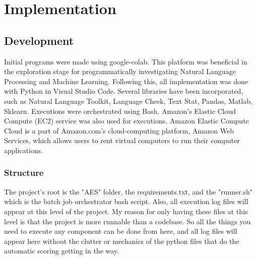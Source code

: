 \chapter{Implementation}\label{C:imp} 



\section{Development}

Initial programs were made using google-colab. This platform was beneficial in the exploration stage for programmatically investigating Natural Language Processing and Machine Learning. Following this, all implementation was done with Python in Visual Studio Code. Several libraries have been incorporated, such as Natural Language Toolkit, Language Check, Text Stat, Pandas, Matlab, Sklearn. Executions were orchestrated using Bash. Amazon's Elastic Cloud Compute (EC2) service was also used for executions. Amazon Elastic Compute Cloud is a part of Amazon.com's cloud-computing platform, Amazon Web Services, which allows users to rent virtual computers to run their computer applications.

\subsection{Structure}

The project's root is the "AES" folder, the requirements.txt, and the "runner.sh" which is the batch job orchestrator bash script. Also, all execution log files will appear at this level of the project. My reason for only having these files at this level is that the project is more runnable than a codebase. So all the things you need to execute any component can be done from here, and all log files will appear here without the clutter or mechanics of the python files that do the automatic scoring getting in the way.

